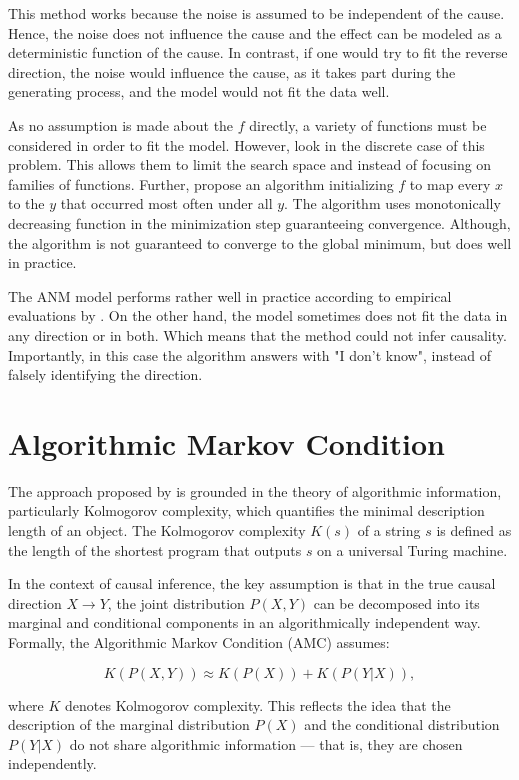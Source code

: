 \documentclass{article}
\begin{document}
This method works because the noise is assumed to be independent of the cause. Hence, the noise does not influence the cause and the effect can be modeled as a deterministic function of the cause. In contrast, if one would try to fit the reverse direction, the noise would influence the cause, as it takes part during the generating process, and the model would not fit the data well.

As no assumption is made about the $f$ directly, a variety of functions must be considered in order to fit the model. However, \cite{peters2011} look in the discrete case of this problem. This allows them to limit the search space and instead of focusing on families of functions. Further, \cite{peters2011} propose an algorithm initializing $f$ to map every $x$ to the $y$ that occurred most often under all $y$. The algorithm uses monotonically decreasing function in the minimization step guaranteeing convergence. Although, the algorithm is not guaranteed to converge to the global minimum, but does well in practice.

The ANM model performs rather well in practice according to empirical evaluations by \cite{peters2011}. On the other hand, the model sometimes does not fit the data in any direction or in both. Which means that the method could not infer causality. Importantly, in this case the algorithm answers with "I don't know", instead of falsely identifying the direction.

\section{Algorithmic Markov Condition}

The approach proposed by \cite{janzing2010} is grounded in the theory of algorithmic information, particularly Kolmogorov complexity, which quantifies the minimal description length of an object. The Kolmogorov complexity $K(s)$ of a string $s$ is defined as the length of the shortest program that outputs $s$ on a universal Turing machine.

In the context of causal inference, the key assumption is that in the true causal direction $X \to Y$, the joint distribution $P(X, Y)$ can be decomposed into its marginal and conditional components in an algorithmically independent way. Formally, the Algorithmic Markov Condition (AMC) assumes:

$$ K(P(X, Y)) \approx K(P(X)) + K(P(Y|X)), $$

where $K$ denotes Kolmogorov complexity. This reflects the idea that the description of the marginal distribution $P(X)$ and the conditional distribution $P(Y|X)$ do not share algorithmic information — that is, they are chosen independently.
\end{document}
